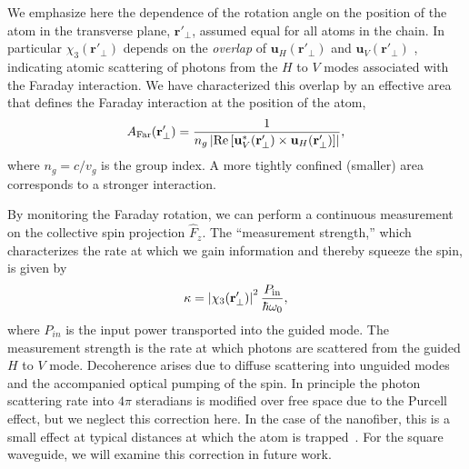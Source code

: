 \documentclass[aps,pra,twocolumn,superscriptaddress]{revtex4-1} %
\newcommand{\mbf}[1]{\mathbf{#1}}
\newcommand{\AF}{A_{\rm Far}} %
\begin{document}
We emphasize here the dependence of the rotation angle on the position of the atom in the transverse plane, $\mbf{r}'_\perp$, assumed equal for all atoms in the chain.  In particular $\chi_3(\mbf{r}'_\perp)$ depends on the {\em overlap} of $\mbf{u}_H (\mbf{r}'_\perp)$ and $\mbf{u}_V (\mbf{r}'_\perp)$ , indicating atomic scattering of photons from the $H$ to $V$ modes associated with the Faraday interaction.  We have characterized this overlap by an effective area that defines the Faraday interaction at the position of the atom,
\begin{equation}\label{eq:AFar}
\AF(\mbf{r}'_\perp) = \frac{1}{n_g \left\vert \text{Re} \left[ \mbf{u}^*_V (\mbf{r}'_\perp) \times \mbf{u}_H (\mbf{r}'_\perp) \right]\right\vert},
\end{equation}
where $n_g = c/v_g$ is the group index.  A more tightly confined (smaller) area corresponds to a stronger interaction.

By monitoring the Faraday rotation, we can perform a continuous measurement on the collective spin projection $\hat{F}_z$.  The ``measurement strength,'' which characterizes the rate at which we gain information and thereby squeeze the spin, is given by
\begin{equation}\label{eq:kappa}
\kappa = \left\vert \chi_3(\mbf{r}'_\perp) \right\vert^2 \frac{P_{\rm in}}{\hbar \omega_0},
\end{equation}
where $P_{in}$ is the input power transported into the guided mode.  The measurement strength is the rate at which photons are scattered from the guided $H$ to $V$ mode.  Decoherence arises due to diffuse scattering into unguided modes and the accompanied optical pumping of the spin.  In principle the photon scattering rate into $4\pi$ steradians is modified over free space due to the Purcell effect, but we neglect this correction here.  In the case of the nanofiber, this is a small effect at typical distances at which the atom is trapped~\cite{LeKien2005,Kien2008}.  For the square waveguide, we will examine this correction in future work.  
\end{document}
